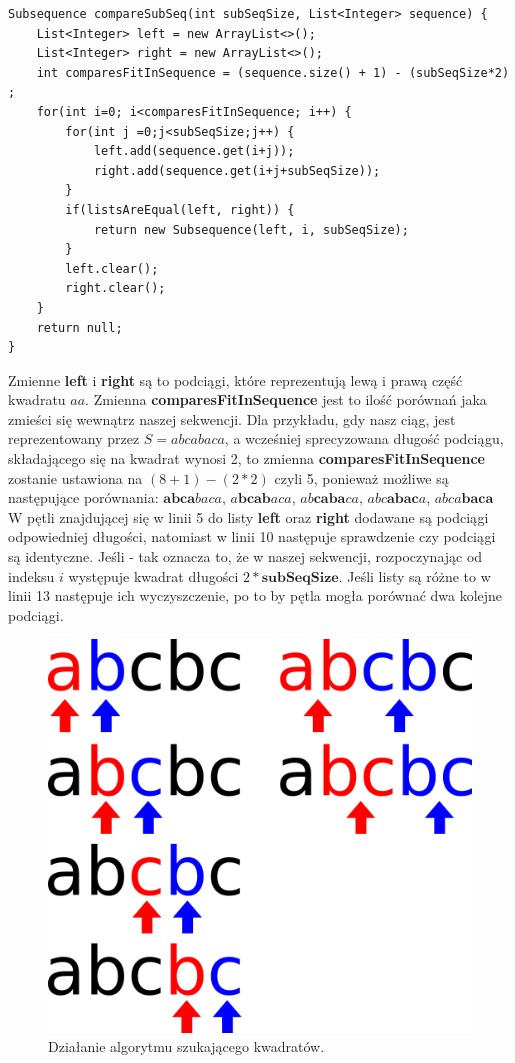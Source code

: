 \documentclass[document]{xmgr}
\begin{document}
\begin{lstlisting}[frame=single]
Subsequence compareSubSeq(int subSeqSize, List<Integer> sequence) {
	List<Integer> left = new ArrayList<>();
	List<Integer> right = new ArrayList<>();
	int comparesFitInSequence = (sequence.size() + 1) - (subSeqSize*2) ;
	for(int i=0; i<comparesFitInSequence; i++) {
		for(int j =0;j<subSeqSize;j++) {
			left.add(sequence.get(i+j));
			right.add(sequence.get(i+j+subSeqSize));
		}
		if(listsAreEqual(left, right)) {
			return new Subsequence(left, i, subSeqSize);
		}
		left.clear();
		right.clear();
	}
	return null;
}
\end{lstlisting}
Zmienne \textbf{left} i \textbf{right} są to podciągi, które reprezentują lewą i prawą część kwadratu $aa$. Zmienna \textbf{comparesFitInSequence} jest to ilość porównań jaka zmieści się wewnątrz naszej sekwencji. Dla przykładu, gdy nasz ciąg, jest reprezentowany przez $S = abcabaca$, a wcześniej sprecyzowana długość podciągu, składającego się na kwadrat wynosi 2, to zmienna \textbf{comparesFitInSequence} zostanie ustawiona na $(8 + 1) - (2 * 2)$ czyli 5, ponieważ możliwe są następujące porównania: $\textbf{abca}baca$, $a\textbf{bcab}aca$, $ab\textbf{caba}ca$, $abc\textbf{abac}a$, $abca\textbf{baca}$
W pętli znajdującej się w linii 5 do listy \textbf{left} oraz \textbf{right} dodawane są podciągi odpowiedniej długości, natomiast w linii 10 następuje sprawdzenie czy podciągi są identyczne. Jeśli - tak oznacza to, że w naszej sekwencji, rozpoczynając od indeksu $i$ występuje kwadrat długości $2 * \textbf{subSeqSize}$. Jeśli listy są różne to w linii 13 następuje ich wyczyszczenie, po to by pętla mogła porównać dwa kolejne podciągi.

\begin{figure}[H]
    \centering
    \includegraphics[scale = 0.2]{images/squareFinding}
    \caption{Działanie algorytmu szukającego kwadratów.}
    \label{fig:squareFinding}
\end{figure}
\end{document}
